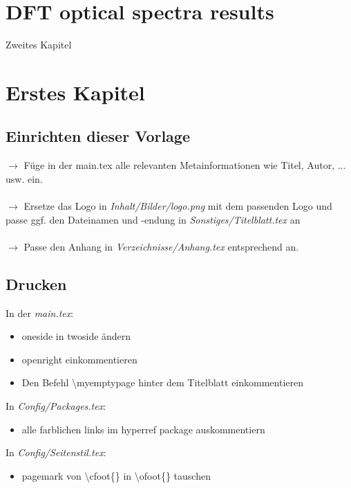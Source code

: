 \chapter{DFT optical spectra results}
\label{chap:Zweites Kapitel}
%
Zweites Kapitel
%
%



\chapter{Erstes Kapitel}
%
%
\section{Einrichten dieser Vorlage}
\label{sec:Einrichten dieser Vorlage}
%
$\rightarrow$ Füge in der main.tex alle relevanten Metainformationen wie Titel, Autor, ... usw. ein.\\\\
%
$\rightarrow$ Ersetze das Logo in \textit{Inhalt/Bilder/logo.png} mit dem passenden Logo und passe ggf. den Dateinamen und -endung in \textit{Sonstiges/Titelblatt.tex} an\\\\
%
$\rightarrow$ Passe den Anhang in \textit{Verzeichnisse/Anhang.tex} entsprechend an.
%
%
\section{Drucken}
\label{sec:Drucken}
%
In der \textit{main.tex}:
\begin{itemize}
    \item oneside in twoside ändern
    \item openright einkommentieren
    \item  Den Befehl \textbackslash myemptypage hinter dem Titelblatt einkommentieren
\end{itemize}
%
In \textit{Config/Packages.tex}: 
\begin{itemize}
    \item alle farblichen links im hyperref package auskommentiern
\end{itemize}
%
In \textit{Config/Seitenstil.tex}: 
\begin{itemize}
    \item  pagemark von \textbackslash cfoot\{\} in \textbackslash ofoot\{\} tauschen
\end{itemize}
%
%
